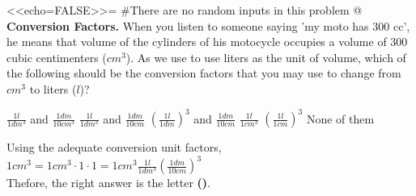 \begin{problem}[h]
<<echo=FALSE>>=
#There are no random inputs in this problem
@
{\bf Conversion Factors.} When you listen to someone saying 'my moto has 300 cc', he means that volume of the cylinders of his motocycle occupies a volume of 300 cubic centimenters ($cm^3$). As we use to use liters as the unit of volume, which of the following should be the conversion factors that you may use to change from $cm^3$ to liters ($l$)?
\begin{answers}{3}
    \bChoices[random]
     $\frac{1l}{1dm^3}$ and $\frac{1dm}{10cm^3}$\eAns  
     $\frac{1l}{1dm^3}$ and $\frac{1dm}{10cm}$\eAns  
     $(\frac{1l}{1dm})^3$ and $\frac{1dm}{10cm}$\eAns
     $\frac{1l}{1cm^3}$\eAns 
     $(\frac{1l}{1cm})^3$\eAns
    \eFreeze
     \label{resp} None of them\eAns
    \eChoices 
\end{answers}
\begin{solution}
Using the adequate conversion unit factors, \\
$1cm^3=1cm^3\cdot 1\cdot 1 = 1cm^3\frac{1l}{1dm^3}(\frac{1dm}{10cm})^3$\\
Thefore, the right answer is the letter \textbf{()}.
\end{solution}
\end{problem}
